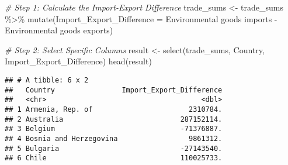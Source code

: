 \documentclass[
]{article}
\newenvironment{Shaded}{\begin{snugshade}}{\end{snugshade}}
\newcommand{\AttributeTok}[1]{\textcolor[rgb]{0.77,0.63,0.00}{#1}}
\newcommand{\CommentTok}[1]{\textcolor[rgb]{0.56,0.35,0.01}{\textit{#1}}}
\newcommand{\FunctionTok}[1]{\textcolor[rgb]{0.00,0.00,0.00}{#1}}
\newcommand{\NormalTok}[1]{#1}
\newcommand{\OtherTok}[1]{\textcolor[rgb]{0.56,0.35,0.01}{#1}}
\newcommand{\SpecialCharTok}[1]{\textcolor[rgb]{0.00,0.00,0.00}{#1}}
\newcommand{\StringTok}[1]{\textcolor[rgb]{0.31,0.60,0.02}{#1}}
\begin{document}
\begin{Shaded}
\begin{Highlighting}[]
\CommentTok{\# Step 1: Calculate the Import{-}Export Difference}
\NormalTok{trade\_sums }\OtherTok{\textless{}{-}}\NormalTok{ trade\_sums }\SpecialCharTok{\%\textgreater{}\%}
  \FunctionTok{mutate}\NormalTok{(}\AttributeTok{Import\_Export\_Difference =} \StringTok{\textasciigrave{}}\AttributeTok{Environmental goods imports}\StringTok{\textasciigrave{}} \SpecialCharTok{{-}} \StringTok{\textasciigrave{}}\AttributeTok{Environmental goods exports}\StringTok{\textasciigrave{}}\NormalTok{)}

\CommentTok{\# Step 2: Select Specific Columns}
\NormalTok{result }\OtherTok{\textless{}{-}} \FunctionTok{select}\NormalTok{(trade\_sums, Country, Import\_Export\_Difference)}
\FunctionTok{head}\NormalTok{(result)}
\end{Highlighting}
\end{Shaded}

\begin{verbatim}
## # A tibble: 6 x 2
##   Country                Import_Export_Difference
##   <chr>                                     <dbl>
## 1 Armenia, Rep. of                       2310784.
## 2 Australia                            287152114.
## 3 Belgium                              -71376887.
## 4 Bosnia and Herzegovina                 9861312.
## 5 Bulgaria                             -27143540.
## 6 Chile                                110025733.
\end{verbatim}
\end{document}
